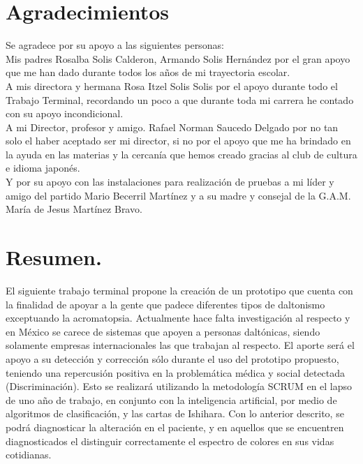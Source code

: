 \documentclass[10pt]{article}
\begin{document}
\newpage
 
\section{Agradecimientos}

Se agradece por su apoyo a las siguientes personas: \\
 Mis padres Rosalba Solis Calderon, Armando Solis Hernández por el gran apoyo que me han dado durante todos los años de mi trayectoria escolar.\\
 
A mis directora y hermana  Rosa Itzel Solis Solis por el apoyo durante todo el Trabajo Terminal, recordando un poco a que durante toda mi carrera he contado con su apoyo incondicional.\\

A mi Director, profesor y amigo. Rafael Norman Saucedo Delgado por no tan solo el haber aceptado ser mi director, si no por el apoyo que me ha brindado en la ayuda en las materias y la cercanía que hemos creado gracias al club de cultura e idioma japonés. \\
Y por su apoyo con las instalaciones para realización de pruebas a mi líder y amigo del partido Mario Becerril Martínez y a su madre y consejal de la G.A.M. María de Jesus Martínez Bravo.

\newpage

\tableofcontents 

\newpage


 
\section{Resumen.}

 El siguiente trabajo terminal propone la creación de un prototipo que cuenta con la finalidad de apoyar a la gente que padece diferentes tipos de daltonismo exceptuando la acromatopsia. Actualmente hace falta investigación al respecto y en México se carece de sistemas que apoyen a personas daltónicas, siendo solamente empresas internacionales las que trabajan al respecto. El aporte será el apoyo a su detección y corrección sólo durante el uso del prototipo propuesto, teniendo una repercusión positiva en la problemática médica y social detectada (Discriminación). Esto se realizará utilizando la metodología SCRUM en el lapso de uno año de trabajo, en conjunto con la inteligencia artificial, por medio de algoritmos de clasificación, y las cartas de Ishihara. Con lo anterior descrito, se podrá diagnosticar la alteración en el paciente, y en aquellos que se encuentren diagnosticados el distinguir correctamente el espectro de colores en sus vidas cotidianas.
\end{document}
